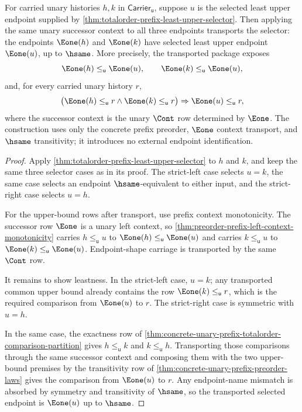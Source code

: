\begin{theorem}
\label{thm:totalorder-prefix-least-upper-successor-transport}
For carried unary histories $h,k$ in $\mathsf{Carrier}_{\mathsf{u}}$, suppose
$u$ is the selected least upper endpoint supplied by
\autoref{thm:totalorder-prefix-least-upper-selector}. Then applying the same
unary successor context to all three endpoints transports the selector: the
endpoints $\Eone(h)$ and $\Eone(k)$ have selected least upper endpoint
$\Eone(u)$, up to $\hsame$. More precisely, the transported package exposes
$$
\Eone(h)\le_{\mathsf{u}}\Eone(u),
\qquad
\Eone(k)\le_{\mathsf{u}}\Eone(u),
$$
and, for every carried unary history $r$,
$$
\bigl(\Eone(h)\le_{\mathsf{u}}r\land\Eone(k)\le_{\mathsf{u}}r\bigr)
\Rightarrow
\Eone(u)\le_{\mathsf{u}}r,
$$
where the successor context is the unary $\Cont$ row determined by $\Eone$.
The construction uses only the concrete prefix preorder, $\Eone$ context
transport, and $\hsame$ transitivity; it introduces no external endpoint
identification.
\end{theorem}
\begin{proof}
Apply
\autoref{thm:totalorder-prefix-least-upper-selector} to $h$ and $k$, and keep
the same three selector cases as in its proof. The strict-left case selects
$u=k$, the same case selects an endpoint $\hsame$-equivalent to either input,
and the strict-right case selects $u=h$.

For the upper-bound rows after transport, use prefix context monotonicity.
The successor row $\Eone$ is a unary left context, so
\autoref{thm:preorder-prefix-left-context-monotonicity} carries
$h\le_{\mathsf{u}}u$ to
$\Eone(h)\le_{\mathsf{u}}\Eone(u)$ and carries
$k\le_{\mathsf{u}}u$ to
$\Eone(k)\le_{\mathsf{u}}\Eone(u)$. Endpoint-shape carriage is transported by
the same $\Cont$ row.

It remains to show leastness. In the strict-left case, $u=k$; any transported
common upper bound already contains the row
$\Eone(k)\le_{\mathsf{u}}r$, which is the required comparison from
$\Eone(u)$ to $r$. The strict-right case is symmetric with $u=h$.

In the same case, the exactness row of
\autoref{thm:concrete-unary-prefix-totalorder-comparison-partition} gives
$h\le_{\mathsf{u}}k$ and $k\le_{\mathsf{u}}h$. Transporting those comparisons
through the same successor context and composing them with the two upper-bound
premises by the transitivity row of
\autoref{thm:concrete-unary-prefix-preorder-laws} gives the comparison from
$\Eone(u)$ to $r$. Any endpoint-name mismatch is absorbed by symmetry and
transitivity of $\hsame$, so the transported selected endpoint is
$\Eone(u)$ up to $\hsame$.
\end{proof}
